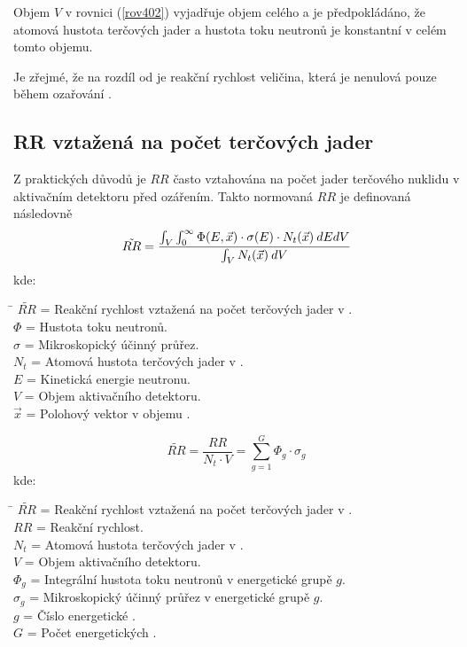 Objem $V$ v rovnici (\ref{rov402}) vyjadřuje objem celého  a je předpokládáno, že atomová hustota terčových jader a hustota toku neutronů je konstantní v celém tomto objemu. 

Je zřejmé, že na rozdíl od  je reakční rychlost veličina, která je nenulová pouze během ozařování .

\subsection{RR vztažená na počet terčových jader}
Z praktických důvodů je $RR$ často vztahována na počet jader terčového nuklidu v aktivačním detektoru před ozářením. Takto normovaná $RR$ je definovaná následovně 
\begin{equation}
    \label{rov403}
    \tilde{RR} = \frac{\int\displaylimits_{V}\int\displaylimits_{0}^{\infty} \Phi(E,\vec{x}) \cdot \sigma(E) \cdot N_t(\vec{x}) \: dE dV}{\int\displaylimits_{V}N_t(\vec{x}) \: dV}
\end{equation}
kde:
\begin{tabbing}
    \= \kill
    $\tilde{RR}$\> = Reakční rychlost vztažená na počet terčových jader v . \\
    $\Phi$\> = Hustota toku neutronů. \\
    $\sigma$\> = Mikroskopický účinný průřez. \\
    $N_t$\> = Atomová hustota terčových jader v . \\
    $E$\> = Kinetická energie neutronu. \\
    $V$\> = Objem aktivačního detektoru. \\
    $\vec{x}$\> = Polohový vektor v objemu . \\
\end{tabbing}

\begin{equation}
    \label{rov404}
    \tilde{RR} = \frac{RR}{N_t \cdot V} = \sum_{g=1}^{G} \Phi_g \cdot \sigma_g
\end{equation}
kde:
\begin{tabbing}
    \= \kill
    $\tilde{RR}$\> = Reakční rychlost vztažená na počet terčových jader v . \\
    $RR$\> = Reakční rychlost. \\
    $N_t$\> = Atomová hustota terčových jader v . \\
    $V$\> = Objem aktivačního detektoru. \\
    $\Phi_g$\> = Integrální hustota toku neutronů v energetické grupě $g$. \\
    $\sigma_g$\> = Mikroskopický účinný průřez v energetické grupě $g$. \\
    $g$\> = Číslo energetické . \\
    $G$\> = Počet energetických . \\
\end{tabbing}